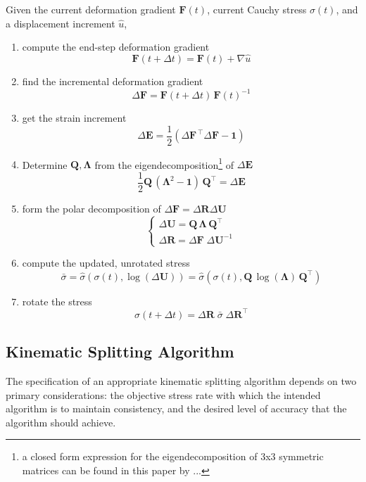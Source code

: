 \begin{tcolorbox}
Given the current deformation gradient $\mathbf{F}(t)$, current Cauchy stress $\sigma(t)$, and
a displacement increment $\hat{u}$,
\begin{enumerate}
\item compute the end-step deformation gradient
$$ \mathbf{F}(t + \Delta t) = \mathbf{F}(t) + \nabla \hat{u} $$
\item find the incremental deformation gradient
$$ \Delta \mathbf{F} = \mathbf{F}(t + \Delta t) \, \mathbf{F}(t)^{-1} $$
\item get the strain increment
$$ \Delta \mathbf{E} = \frac{1}{2}(\Delta \mathbf{F}^{\,\intercal} \Delta \mathbf{F} - \mathbf{1}) $$
\item Determine $\mathbf{Q}, \mathbf{\Lambda}$ from the eigendecomposition\footnote{
a closed form expression for the eigendecomposition of 3x3 symmetric matrices can be found 
in this paper by ...
} of $\Delta \mathbf{E}$
$$ \frac{1}{2} \mathbf{Q} \, (\mathbf{\Lambda}^2 - \mathbf{1}) \, \mathbf{Q}^\intercal = \Delta \mathbf{E} $$
\item form the polar decomposition of $\Delta \mathbf{F} = \Delta \mathbf{R} \Delta \mathbf{U}$
$$ 
\begin{cases} 
  \Delta \mathbf{U} = \mathbf{Q} \, \mathbf{\Lambda} \, \mathbf{Q}^\intercal  \\
  \Delta \mathbf{R} = \Delta \mathbf{F} \; \Delta \mathbf{U}^{-1}
\end{cases}
$$
\item compute the updated, unrotated stress
$$ \bar \sigma = 
\hat{\sigma}(\sigma(t), \log(\Delta \mathbf{U})) = 
\hat{\sigma}(\sigma(t), \mathbf{Q} \, \log(\mathbf{\Lambda}) \, \mathbf{Q}^\intercal)
$$
\item rotate the stress
$$ \sigma(t + \Delta t) = \Delta \mathbf{R} \; \bar{\sigma} \; \Delta \mathbf{R}^\intercal $$
\end{enumerate}
\end{tcolorbox}

\pagebreak

\subsection{Kinematic Splitting Algorithm}

The specification of an appropriate kinematic splitting algorithm depends on two primary considerations: the objective stress rate with which the intended algorithm is to maintain consistency, and the desired level of accuracy that the algorithm should achieve.



